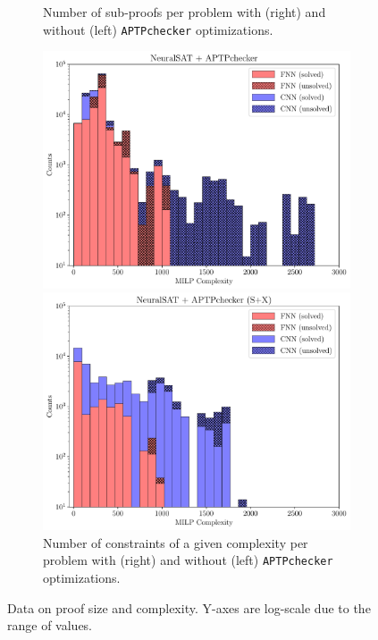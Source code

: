\documentclass[oneside,11pt,dvipsnames]{book}
\newcommand{\nnproofchecker}{\texttt{APTPchecker}}
\begin{document}
\begin{figure}[t]
\begin{subfigure}{0.4\linewidth}
\begin{minipage}[t]{0.235\textwidth}
    \end{minipage}
    \caption{Number of sub-proofs per problem with (right) and without (left) \nnproofchecker{} optimizations.}
    \label{fig:sub-proofs-plots}
\end{subfigure}
\hfill
\begin{subfigure}{0.59\linewidth}
    \centering 
    \begin{minipage}[t]{0.5\textwidth}
        \centering  
        \includegraphics[width=\linewidth]{figure/MILP_COMPLEXITY_NONE.pdf}
    \end{minipage}%
    \begin{minipage}[t]{0.5\textwidth}
        \centering  
        \includegraphics[width=\linewidth]{figure/MILP_COMPLEXITY_SX.pdf}
    \end{minipage}

    \caption{Number of constraints of a given complexity per problem with (right) and without (left) \nnproofchecker{} optimizations.}
    \label{fig:constrs-proofs-plots}
\end{subfigure}
\caption{Data on proof size and complexity.   Y-axes are log-scale due to the range of values.}
\end{figure}
\end{document}

